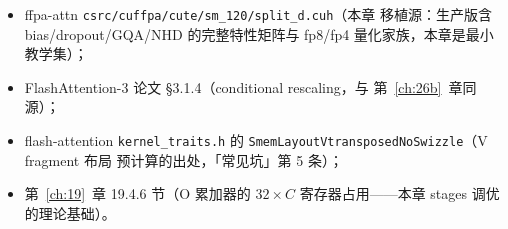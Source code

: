 \begin{itemize}[itemsep=1pt]
  \item ffpa-attn \texttt{csrc/cuffpa/cute/sm\_120/split\_d.cuh}（本章
        移植源：生产版含 bias/dropout/GQA/NHD 的完整特性矩阵与
        fp8/fp4 量化家族，本章是最小教学集）；
  \item FlashAttention-3 论文 \S3.1.4（conditional rescaling，与
        第~\ref{ch:26b}~章同源）；
  \item flash-attention \texttt{kernel\_traits.h} 的
        \texttt{SmemLayoutVtransposedNoSwizzle}（V fragment 布局
        预计算的出处，「常见坑」第 5 条）；
  \item 第~\ref{ch:19}~章 19.4.6 节（O 累加器的 $32\times C$
        寄存器占用——本章 stages 调优的理论基础）。
\end{itemize}
